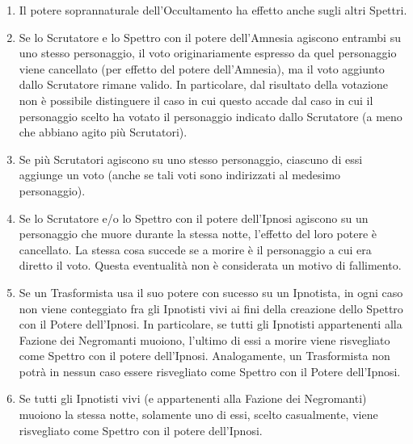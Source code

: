 \documentclass[a4paper,10pt]{article}
\begin{document}
\begin{enumerate}
 \item Il potere soprannaturale dell'Occultamento ha effetto anche sugli altri Spettri.
 
 \item Se lo Scrutatore e lo Spettro con il potere dell'Amnesia agiscono entrambi su uno stesso personaggio, il voto originariamente espresso da quel personaggio viene cancellato (per effetto del potere dell'Amnesia), ma il voto aggiunto dallo Scrutatore rimane valido. In particolare, dal risultato della votazione non è possibile distinguere il caso in cui questo accade dal caso in cui il personaggio scelto ha votato il personaggio indicato
 dallo Scrutatore (a meno che abbiano agito più Scrutatori).
 
 \item Se più Scrutatori agiscono su uno stesso personaggio, ciascuno di essi aggiunge un voto (anche se tali voti sono indirizzati al medesimo personaggio).
 
 \item Se lo Scrutatore e/o lo Spettro con il potere dell'Ipnosi agiscono su un personaggio che muore durante la stessa notte, l'effetto del loro potere è cancellato. 
 La stessa cosa succede se a morire è il personaggio a cui era diretto il voto. Questa eventualità non è considerata un motivo di fallimento.
 
 \item Se un Trasformista usa il suo potere con sucesso su un Ipnotista, in ogni caso non viene conteggiato fra gli Ipnotisti vivi ai fini della creazione dello Spettro con il Potere dell'Ipnosi. In particolare, se tutti gli Ipnotisti appartenenti alla Fazione dei Negromanti muoiono, l'ultimo di essi a morire viene risvegliato come Spettro con il potere dell'Ipnosi. Analogamente, un Trasformista non potrà in nessun caso essere risvegliato come Spettro con il Potere dell'Ipnosi.
 
 \item Se tutti gli Ipnotisti vivi (e appartenenti alla Fazione dei Negromanti) muoiono la stessa notte, solamente uno di essi, scelto casualmente, viene risvegliato come Spettro con il potere dell'Ipnosi.
 

\end{enumerate}
\end{document}
